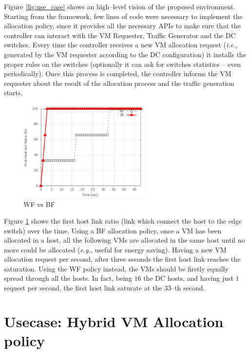 \documentclass[12pt,english,oneside]{book}
\begin{document}
Figure \ref{fig:use_case} shows an high--level vision of the proposed environment. Starting from the framework, few lines of code were necessary to implement the allocation policy, since it provides all the necessary APIs to make sure that the controller can interact with the VM Requester, Traffic Generator and the DC switches.
Every time the controller receives a new VM allocation request (\textit{i.e.}, generated by the VM requester according to the DC configuration) it installs the proper rules on the switches (optionally it can ask for switches statistics -- even periodically). Once this process is completed, the controller informs the VM requester about the result of the allocation process and the traffic generation starts.


\begin{figure}[h!tbp]
        \centering
        \includegraphics[width=0.6\textwidth]{figures/use_case.png}
        \caption{WF vs BF}
        \label{fig:wf_bf}
\end{figure}

Figure \ref{fig:wf_bf} shows the first host link ratio (link which connect the host to the edge switch) over the time.
Using a BF allocation policy, once a VM has been allocated in a host, all the following VMs are allocated in the same host until no more could be allocated (\textit{e.g.}, useful for energy saving). Having a new VM allocation request per second, after three seconds the first host link reaches the saturation.
Using the WF policy instead, the VMs should be firstly equally spread through all the hosts. In fact, being $16$ the DC hosts, and having just $1$ request per second, the first host link saturate at the $33$--th second.

\newpage

\section{Usecase: Hybrid VM Allocation policy}
\end{document}
